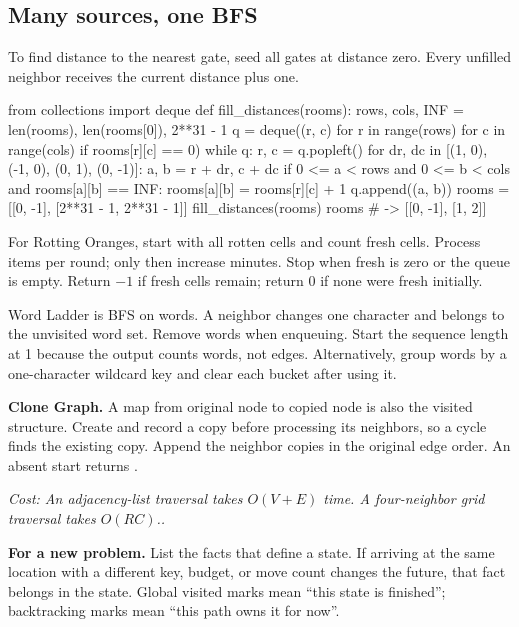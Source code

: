 \documentclass[11pt]{article}
\newcommand{\cd}[1]{{\frenchspacing\texttt{\detokenize{#1}}}}
\newcommand{\transfer}[1]{\par\textbf{For a new problem.} #1\par}
\newcommand{\cost}[1]{\par\textit{Cost: #1.}\par}
\begin{document}
\subsection{Many sources, one BFS}
To find distance to the nearest gate, seed all gates at distance zero.
Every unfilled neighbor receives the current distance plus one.
\par\noindent\begin{minipage}{\linewidth}
\hypertarget{example-start-41}{}
\begin{pyex}
from collections import deque
def fill_distances(rooms):
    rows, cols, INF = len(rooms), len(rooms[0]), 2**31 - 1
    q = deque((r, c) for r in range(rows) for c in range(cols)
              if rooms[r][c] == 0)
    while q:
        r, c = q.popleft()
        for dr, dc in [(1, 0), (-1, 0), (0, 1), (0, -1)]:
            a, b = r + dr, c + dc
            if 0 <= a < rows and 0 <= b < cols and rooms[a][b] == INF:
                rooms[a][b] = rooms[r][c] + 1
                q.append((a, b))
rooms = [[0, -1], [2**31 - 1, 2**31 - 1]]
fill_distances(rooms)
rooms                                # -> [[0, -1], [1, 2]]
\end{pyex}
\hypertarget{example-end-41}{}
\end{minipage}\par
For Rotting Oranges, start with all rotten cells and count fresh cells.
Process \cd{len(q)} items per round; only then increase minutes.
Stop when fresh is zero or the queue is empty. Return \(-1\) if fresh cells remain; return 0 if none were fresh initially.

Word Ladder is BFS on words. A neighbor changes one character and belongs to the unvisited word set.
Remove words when enqueuing. Start the sequence length at 1 because the output counts words, not edges.
Alternatively, group words by a one-character wildcard key and clear each bucket after using it.

\textbf{Clone Graph.} A map from original node to copied node is also the visited structure.
Create and record a copy before processing its neighbors, so a cycle finds the existing copy.
Append the neighbor copies in the original edge order. An absent start returns \cd{None}.
\cost{An adjacency-list traversal takes \(O(V+E)\) time. A four-neighbor grid traversal takes \(O(RC)\).}
\transfer{List the facts that define a state. If arriving at the same location with a different key, budget, or move count changes the future,
that fact belongs in the state. Global visited marks mean ``this state is finished''; backtracking marks mean ``this path owns it for now''.}
\end{document}
